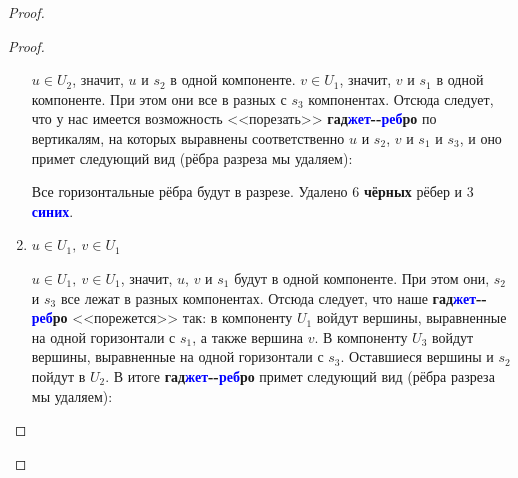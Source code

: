\documentclass[a4paper,12pt]{article}
\begin{document}
\begin{proof}
\begin{proof}
\begin{enumerate}
            $u \in U_2$, значит, $u$ и $s_2$ в одной компоненте. $v \in U_1$, значит, $v$ и $s_1$ в одной компоненте. При этом они все в разных с $s_3$ компонентах. Отсюда следует, что у нас имеется возможность <<порезать>> \textbf{гад}\textbf{\textcolor{blue}{жет}}\textbf{-}\textbf{-}\textbf{\textcolor{blue}{реб}}\textbf{ро} по вертикалям, на которых выравнены соответственно $u$ и $s_2$, $v$ и $s_1$ и $s_3$, и оно примет следующий вид (рёбра разреза мы удаляем):
            
            \begin{center}
            \end{center}
            
            Все горизонтальные рёбра будут в разрезе. Удалено 6 \textbf{чёрных} рёбер и 3 \textbf{\textcolor{blue}{синих}}.
            \item $u \in U_1,\ v \in U_1$
            
            $u \in U_1,\ v \in U_1$, значит, $u$, $v$ и $s_1$ будут в одной компоненте. При этом они, $s_2$ и $s_3$ все лежат в разных компонентах. Отсюда следует, что наше \textbf{гад}\textbf{\textcolor{blue}{жет}}\textbf{-}\textbf{-}\textbf{\textcolor{blue}{реб}}\textbf{ро} <<порежется>> так: в компоненту $U_1$ войдут вершины, выравненные на одной горизонтали с $s_1$, а также вершина $v$. В компоненту $U_3$ войдут вершины, выравненные на одной горизонтали с $s_3$. Оставшиеся вершины и $s_2$ пойдут в $U_2$. В итоге \textbf{гад}\textbf{\textcolor{blue}{жет}}\textbf{-}\textbf{-}\textbf{\textcolor{blue}{реб}}\textbf{ро} примет следующий вид (рёбра разреза мы удаляем):
            

\end{enumerate}
\end{proof}
\end{proof}
\end{document}
